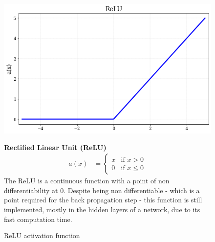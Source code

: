 \begin{figure}[!h]
\begin{minipage}{0.45\textwidth}
    \centering
\includegraphics[width=\textwidth]{sections/03/Images/ReLU.png}
\caption{ReLU activation function}
    \label{fig:act_relu}
\end{minipage}
\hfill
\begin{minipage}{0.5\textwidth}
    \textbf{Rectified Linear Unit (ReLU)}
   \begin{align}
        a(x) &=
        \begin{cases}
        x   & \text{if } x > 0 \\
        0  & \text{if } x \leq 0 
  \end{cases}
\end{align}
The ReLU \cite{relu} is a continuous function with a point of non differentiability at 0. Despite being non differentiable - which is a point required for the back propagation step - this function is still implemented, mostly in the hidden layers of a network, due to its fast computation time. 
\end{minipage}
\end{figure}  


